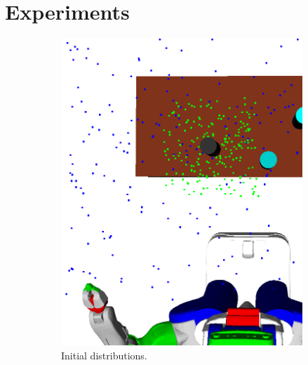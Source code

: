 \section{Experiments}
\begin{figure}[t]
  \centering
  \begin{subfigure}[b]{0.4\linewidth}
    \includegraphics[width=\textwidth]{images/learns.png}
    \caption{Initial distributions.}
  \end{subfigure}
  \begin{subfigure}[b]{0.4\linewidth}

\end{subfigure}
\end{figure}
